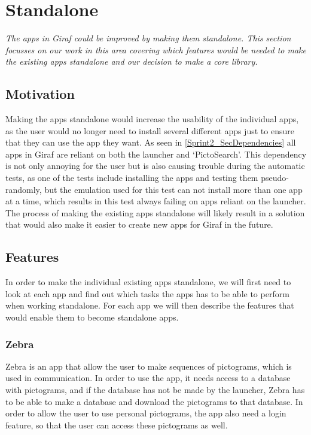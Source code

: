 \section{Standalone}
\textit{The apps in Giraf could be improved by making them standalone. This section focusses on our work in this area covering which features would be needed to make the existing apps standalone and our decision to make a core library.}

\subsection{Motivation}
Making the apps standalone would increase the usability of the individual apps, as the user would no longer need to install several different apps just to ensure that they can use the app they want. As seen in \ref{Sprint2_SecDependencies} all apps in Giraf are reliant on both the launcher and ‘PictoSearch’. This dependency is not only annoying for the user but is also causing trouble during the automatic tests, as one of the tests include installing the apps and testing them pseudo-randomly, but the emulation used for this test can not install more than one app at a time, which results in this test always failing on apps reliant on the launcher. The process of making the existing apps standalone will likely result in a solution that would also make it easier to create new apps for Giraf in the future.

\subsection{Features}
In order to make the individual existing apps standalone, we will first need to look at each app and find out which tasks the apps has to be able to perform when working standalone. For each app we will then describe the features that would enable them to become standalone apps. 

\subsubsection{Zebra}
Zebra is an app that allow the user to make sequences of pictograms, which is used in communication. In order to use the app, it needs access to a database with pictograms, and if the database has not be made by the launcher, Zebra has to be able to make a database and download the pictograms to that database. In order to allow the user to use personal pictograms, the app also need a login feature, so that the user can access these pictograms as well.
